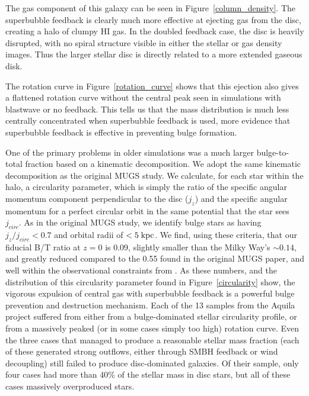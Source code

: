 The gas component of this galaxy can be seen in Figure~\ref{column_density}.
The superbubble feedback is clearly much more effective at ejecting gas from the
disc, creating a halo of clumpy HI gas.  In the doubled feedback case, the disc
is heavily disrupted, with no spiral structure visible in either the stellar or
gas density images.  Thus the larger stellar disc is directly related to a more
extended gaseous disk.

The rotation curve in Figure~\ref{rotation_curve} shows that this ejection also
gives a flattened rotation curve without the central peak seen in simulations
with blastwave or no feedback.  This tells us that the mass distribution is much
less centrally concentrated when superbubble feedback is used, more evidence
that superbubble feedback is effective in preventing bulge formation.

One of the primary problems in older simulations was a much larger
bulge-to-total fraction based on a kinematic decomposition.  We adopt the same
kinematic decomposition as the original MUGS study.  We calculate, for each star
within the halo, a circularity parameter, which is simply the ratio of the
specific angular momentum component perpendicular to the disc ($j_z$) and the
specific angular momentum for a perfect circular orbit in the same potential
that the star sees $j_{circ}$.  As in the original MUGS study, we identify bulge
stars as having $j_z/j_{circ} < 0.7$ and orbital radii of $< 5\; \rm{kpc}$.  We
find, using these criteria, that our fiducial B/T ratio at $z=0$ is 0.09,
slightly smaller than the Milky Way's $\sim0.14$, and greatly reduced compared
to the 0.55 found in the original MUGS paper, and well within the observational
constraints from \citet{Allen2006}.  As these numbers, and the distribution of
this circularity parameter found in Figure~\ref{circularity} show, the vigorous
expulsion of central gas with superbubble feedback is a powerful bulge
prevention and destruction mechanism.  Each of the 13 samples from the Aquila
project \citep{Scannapieco2012} suffered from either from a bulge-dominated
stellar circularity profile, or from a massively peaked (or in some cases simply
too high) rotation curve.  Even the three cases that managed to produce a
reasonable stellar mass fraction (each of these generated strong outflows,
either through SMBH feedback or wind decoupling) still failed to produce
disc-dominated galaxies.  Of their sample, only four cases had more than 40\% of
the stellar mass in disc stars, but all of these cases massively overproduced
stars.

